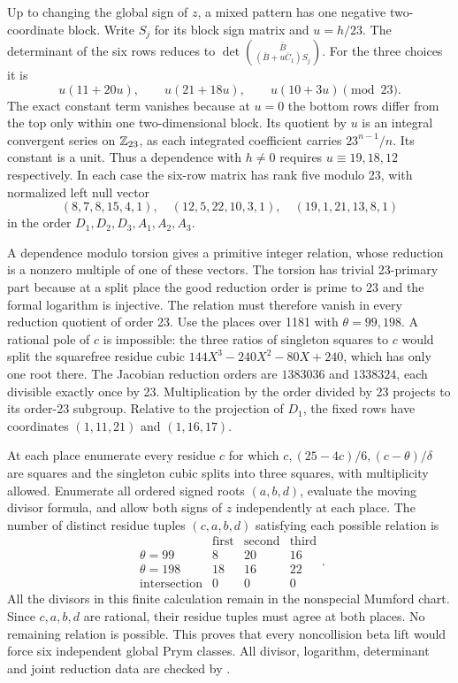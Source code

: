 Up to changing the global sign of $z$, a mixed pattern has one
negative two-coordinate block. Write $S_j$ for its block sign matrix
and $u=h/23$. The determinant of the six rows reduces to
$\det\binom{\bar B}{(\bar B+u\bar C_1)S_j}$. For the three choices
it is
\[
 u(11+20u),\qquad u(21+18u),\qquad u(10+3u)\pmod{23}.
\]
The exact constant term vanishes because at $u=0$ the bottom rows
differ from the top only within one two-dimensional block. Its
quotient by $u$ is an integral convergent series on $\mathbb Z_{23}$,
as each integrated coefficient carries $23^{n-1}/n$. Its constant
is a unit. Thus a dependence with $h\ne0$ requires
$u\equiv19,18,12$ respectively. In each case the six-row matrix
has rank five modulo 23, with normalized left null vector
\[
 (8,7,8,15,4,1),\quad(12,5,22,10,3,1),\quad(19,1,21,13,8,1)
\]
in the order $D_1,D_2,D_3,A_1,A_2,A_3$.

A dependence modulo torsion gives a primitive integer relation, whose
reduction is a nonzero multiple of one of these vectors. The torsion
has trivial 23-primary part because at a split place the good
reduction order is prime to 23 and the formal logarithm is injective.
The relation must therefore vanish in every reduction quotient of
order 23. Use the places over 1181 with $\theta=99,198$. A rational
pole of $c$ is impossible: the three ratios of singleton squares to
$c$ would split the squarefree residue cubic
$144X^3-240X^2-80X+240$, which has only one root there. The
Jacobian reduction orders are $1383036$ and $1338324$, each divisible
exactly once by 23. Multiplication by the order divided by 23 projects
to its order-23 subgroup. Relative to the projection of $D_1$, the
fixed rows have coordinates $(1,11,21)$ and $(1,16,17)$.

At each place enumerate every residue $c$ for which
$c,(25-4c)/6,(c-\theta)/\delta$ are squares and the singleton
cubic splits into three squares, with multiplicity allowed. Enumerate
all ordered signed roots $(a,b,d)$, evaluate the moving divisor
formula, and allow both signs of $z$ independently at each place.
The number of distinct residue tuples $(c,a,b,d)$ satisfying each
possible relation is
\[
\begin{array}{c|rrr}
 &\text{first}&\text{second}&\text{third}\\ \hline
 \theta=99&8&20&16\\
 \theta=198&18&16&22\\
 \text{intersection}&0&0&0
\end{array}.
\]
All the divisors in this finite calculation remain in the nonspecial
Mumford chart. Since $c,a,b,d$ are rational, their residue tuples
must agree at both places. No remaining relation is possible. This
proves that every noncollision beta lift would force six independent
global Prym classes. All divisor, logarithm, determinant and joint
reduction data are checked by .

